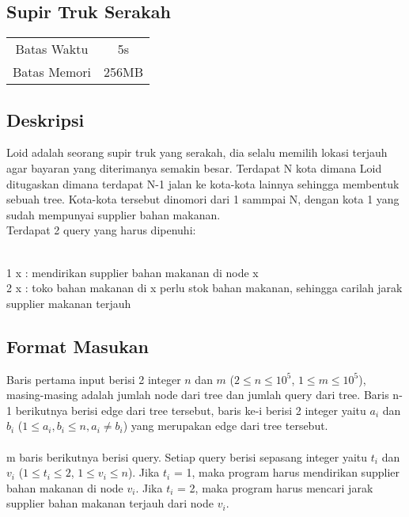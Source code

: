\documentclass{article}
\begin{document}
\begin{center}

    
    \section*{Supir Truk Serakah} %

    \begin{tabular}{ | c c | }
        \hline
        Batas Waktu  & 5s \\    %
        Batas Memori & 256MB \\  %
        \hline
    \end{tabular}
\end{center}

\subsection*{Deskripsi}
Loid adalah seorang supir truk yang serakah, dia selalu memilih lokasi terjauh agar bayaran yang diterimanya semakin besar. Terdapat N kota dimana Loid ditugaskan dimana terdapat N-1 jalan ke kota-kota lainnya sehingga membentuk sebuah tree. Kota-kota tersebut dinomori dari 1 sammpai N, dengan kota 1 yang sudah mempunyai supplier bahan makanan. \\
Terdapat 2 query yang harus dipenuhi:

\\ 1 x : mendirikan supplier bahan makanan di node x
\\ 2 x : toko bahan makanan di x perlu stok bahan makanan, sehingga carilah jarak supplier makanan terjauh


\subsection*{Format Masukan}
Baris pertama  input berisi 2 integer $n$ dan $m$ ($2 \leq n \leq 10^5$, $1 \leq m \leq 10^5$), masing-masing adalah jumlah node dari tree dan jumlah query dari tree. Baris n-1 berikutnya berisi edge dari tree tersebut, baris ke-i berisi 2 integer yaitu $a_i$ dan $b_i$ ($1 \leq a_i, b_i \leq n, a_i \neq b_i$) yang merupakan edge dari tree tersebut.
\\
\\
m baris berikutnya berisi query. Setiap query berisi sepasang integer yaitu $t_i$ dan $v_i$ ($1 \leq t_i \leq 2$, $1 \leq v_i \leq n$). Jika $t_i$ = 1, maka program harus mendirikan supplier bahan makanan di node $v_i$. Jika $t_i$ = 2, maka program harus mencari jarak supplier bahan makanan terjauh dari node $v_i$.
\end{document}
